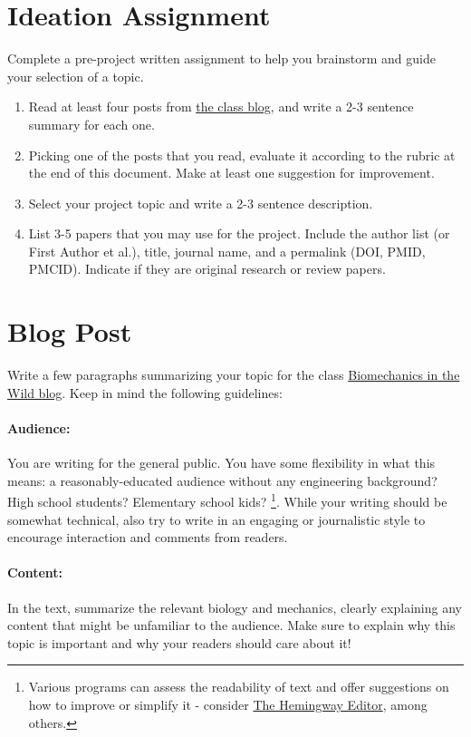 \documentclass[11pt]{article}
\begin{document}
\section{Ideation Assignment}
Complete a pre-project written assignment to help you brainstorm and guide your selection of a topic.  
\begin{enumerate}
\item Read at least four posts from \href{http://sites.nd.edu/biomechanics-in-the-wild/}{the class blog}, and write a 2-3 sentence summary for each one.

\item Picking one of the posts that you read, evaluate it according to the rubric at the end of this document.  Make at least one suggestion for improvement.

\item Select your project topic and write a 2-3 sentence description.  

\item List 3-5 papers that you may use for the project.  Include the author list (or First Author et al.), title, journal name, and a permalink (DOI, PMID, PMCID).  Indicate if they are original research or review papers.
\end{enumerate}

\section{Blog Post}
Write a few paragraphs summarizing your topic for the class \href{https://sites.nd.edu/biomechanics-in-the-wild/}{Biomechanics in the Wild blog}.  Keep in mind the following guidelines: 

\paragraph{Audience:} 
You are writing for the general public.  You have some flexibility in what this means: a reasonably-educated audience without any engineering background?  High school students?  Elementary school kids?%
\footnote{Various programs can assess the readability of text and offer suggestions on how to improve or simplify it - consider \href{http://www.hemingwayapp.com/}{The Hemingway Editor}, among others.}.
While your writing should be somewhat technical, also try to write in an engaging or journalistic style to encourage interaction and comments from readers.  

\paragraph{Content:} 
In the text, summarize the relevant biology and mechanics, clearly explaining any content that might be unfamiliar to the audience.  
Make sure to explain why this topic is important and why your readers should care about it!
\end{document}
